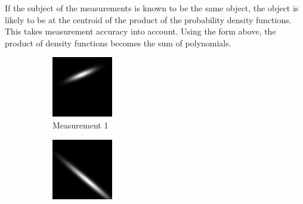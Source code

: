 \documentclass{article}
\begin{document}
        If the subject of the measurements is known to be the same object, the object is likely to be at the centroid of the product of the probability density functions.  This takes measurement accuracy into account.
        Using the form above, the product of density functions becomes the sum of polynomials.
        \begin{figure}
        \centering
        \begin{subfigure}{.3\textwidth}
          \centering
          \includegraphics[width=.8\linewidth]{images/GaussianLine1.png}
          \caption{Measurement 1}
          \label{fig:uncProdsub1}
        \end{subfigure}%
        \begin{subfigure}{.3\textwidth}
          \centering
          \includegraphics[width=.8\linewidth]{images/GaussianLine2.png}

\end{subfigure}
\end{figure}
\end{document}
